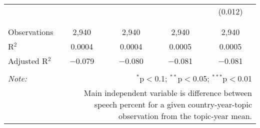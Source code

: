 \begin{table}[!htbp]
\begin{tabular}{@{\extracolsep{5pt}}lcccc}
  &  &  &  & (0.012) \\ 
  & & & & \\ 
\hline \\[-1.8ex] 
Observations & 2,940 & 2,940 & 2,940 & 2,940 \\ 
R$^{2}$ & 0.0004 & 0.0004 & 0.0005 & 0.0005 \\ 
Adjusted R$^{2}$ & $-$0.079 & $-$0.080 & $-$0.081 & $-$0.081 \\ 
\hline 
\hline \\[-1.8ex] 
\textit{Note:}  & \multicolumn{4}{r}{$^{*}$p$<$0.1; $^{**}$p$<$0.05; $^{***}$p$<$0.01} \\ 
 & \multicolumn{4}{r}{Main independent variable is difference between speech percent for a given country-year-topic observation from the topic-year mean.} \\ 
\end{tabular} 
\end{table} 
